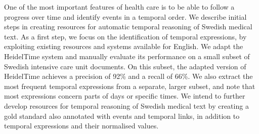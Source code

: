 One of the most important features of health care is to be able to follow a progress over time and identify events in a temporal order. We describe initial steps in creating resources for automatic temporal reasoning of Swedish medical text. As a first step, we focus on the identification of temporal expressions, by exploiting existing resources and systems available for English. We adapt the HeidelTime system and manually evaluate its performance on a small subset of Swedish intensive care unit documents. On this subset, the adapted version of HeidelTime achieves a precision of 92\% and a recall of 66\%. We also extract the most frequent temporal expressions from a separate, larger subset, and note that most expressions concern parts of days or specific times. We intend to further develop resources for temporal reasoning of Swedish medical text by creating a gold standard also annotated with events and temporal links, in addition to temporal expressions and their normalised values.
